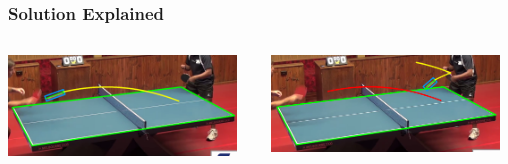 \documentclass{beamer}
\begin{document}
\begin{frame}
	\frametitle{Solution Explained}
	\begin{columns}[onlytextwidth]
		\begin{column}{0.5\textwidth}
		\begin{center}
			\includegraphics[width=0.95\textwidth]{result_4}\\
		\end{center}
		
		\end{column}
		\begin{column}{0.5\textwidth}
			\begin{center}
			\includegraphics[width=0.95\textwidth]{result_14}\\
			\end{center}
		\end{column}
	\end{columns}
	
\end{frame}
\end{document}
